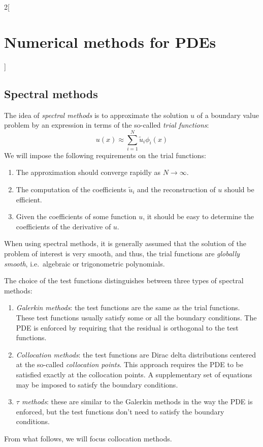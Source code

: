 \documentclass[../../../main_math.tex]{subfiles}
\begin{document}
\begin{multicols}{2}[\section{Numerical methods for PDEs}]
  \subsection{Spectral methods}
  \begin{definition}\label{NMPDE:spectral_method}
    The idea of \emph{spectral methods} is to approximate the solution $u$ of a boundary value problem by an expression in terms of the so-called \emph{trial functions}:
    $$
      u(x)\approx \sum_{i=1}^N \tilde{u}_i\phi_i(x)
    $$
    We will impose the following requirements on the trial functions:
    \begin{enumerate}
      \item The approximation should converge rapidly as $N\to\infty$.
      \item The computation of the coefficients $\tilde{u}_i$ and the reconstruction of $u$ should be efficient.
      \item Given the coefficients of some function $u$, it should be easy to determine the coefficients of the derivative of $u$.
    \end{enumerate}
  \end{definition}
  \begin{remark}
    When using spectral methods, it is generally assumed that the solution of the problem of interest is very smooth, and thus, the trial functions are \emph{globally smooth}, i.e.\ algebraic or trigonometric polynomials.
  \end{remark}
  \begin{definition}
    The choice of the test functions distinguishes between three types of spectral methods:
    \begin{enumerate}
      \item \emph{Galerkin methods}: the test functions are the same as the trial functions. These test functions usually satisfy some or all the boundary conditions. The PDE is enforced by requiring that the residual is orthogonal to the test functions.
      \item \emph{Collocation methods}: the test functions are Dirac delta distributions centered at the so-called \emph{collocation points}. This approach requires the PDE to be satisfied exactly at the collocation points. A supplementary set of equations may be imposed to satisfy the boundary conditions.
      \item \emph{$\tau$ methods}: these are similar to the Galerkin methods in the way the PDE is enforced, but the test functions don't need to satisfy the boundary conditions.
    \end{enumerate}
  \end{definition}
  \begin{remark}
    From what follows, we will focus collocation methods.
  \end{remark}

\end{multicols}
\end{document}
